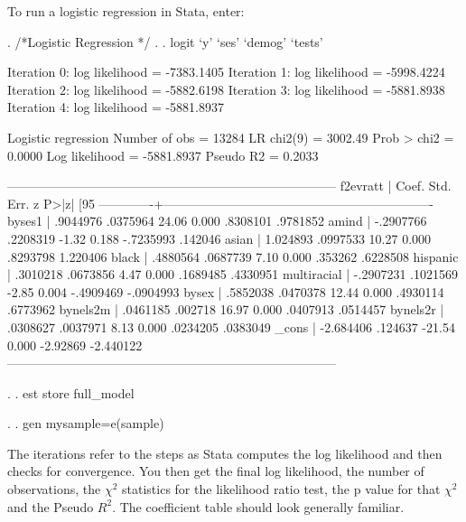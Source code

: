 \documentclass[12pt]{article}
\begin{document}
To run a logistic regression in Stata, enter:

\begin{stlog}
  
. /*Logistic Regression */
. 
. logit `y' `ses' `demog' `tests'

Iteration 0:   log likelihood = -7383.1405  
Iteration 1:   log likelihood = -5998.4224  
Iteration 2:   log likelihood = -5882.6198  
Iteration 3:   log likelihood = -5881.8938  
Iteration 4:   log likelihood = -5881.8937  

Logistic regression                               Number of obs   =      13284
                                                  LR chi2(9)      =    3002.49
                                                  Prob > chi2     =     0.0000
Log likelihood = -5881.8937                       Pseudo R2       =     0.2033

------------------------------------------------------------------------------
    f2evratt |      Coef.   Std. Err.      z    P>|z|     [95%
-------------+----------------------------------------------------------------
      byses1 |   .9044976   .0375964    24.06   0.000     .8308101    .9781852
       amind |  -.2907766   .2208319    -1.32   0.188    -.7235993     .142046
       asian |   1.024893   .0997533    10.27   0.000     .8293798    1.220406
       black |   .4880564   .0687739     7.10   0.000      .353262    .6228508
    hispanic |   .3010218   .0673856     4.47   0.000     .1689485    .4330951
 multiracial |  -.2907231   .1021569    -2.85   0.004    -.4909469   -.0904993
       bysex |   .5852038   .0470378    12.44   0.000     .4930114    .6773962
    bynels2m |   .0461185    .002718    16.97   0.000     .0407913    .0514457
    bynels2r |   .0308627   .0037971     8.13   0.000     .0234205    .0383049
       _cons |  -2.684406    .124637   -21.54   0.000     -2.92869   -2.440122
------------------------------------------------------------------------------

. 
. est store full_model

. 
. gen mysample=e(sample)

\end{stlog}

The iterations refer to the steps as Stata computes the log likelihood
and then checks for convergence. You then get the final log
likelihood, the number of observations, the $\chi^2$ statistics for
the likelihood ratio test, the p value for that $\chi^2$ and the
Pseudo $R^2$. The coefficient table should look generally familiar. 
\end{document}

